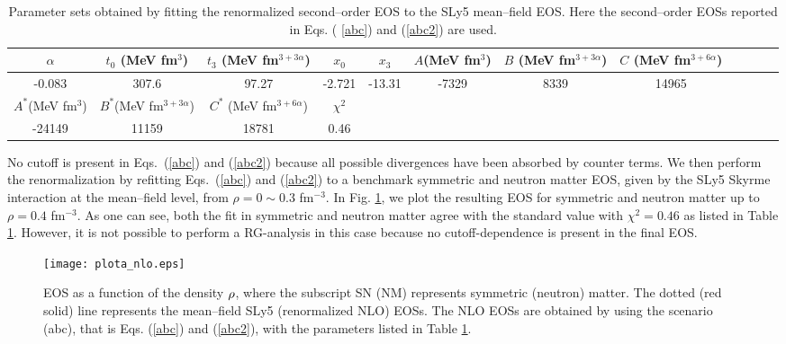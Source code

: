 \documentclass[aps,11pt,prc,preprint,superscriptaddress,nofootinbib]{revtex4}
\begin{document}
\begin{table}[tbp]
\centering%
\begin{tabular}{cccccccccccc}
\hline\hline
$\alpha $ & $t_{0}$ (MeV fm$^{3}$) & $t_{3}$ (MeV fm$^{3+3\alpha}$) & $x_{0}$
& $x_{3}$ & $A$(MeV fm$^{3}$) & $B$ (MeV fm$^{3+3\alpha}$) & $C$ (MeV fm$%
^{3+6\alpha}$) &  &  &  &  \\ \hline
-0.083 & 307.6 & 97.27 & -2.721 & -13.31 & -7329 & 8339 & 14965 &  &  &  &
\\ \hline\hline
$A^{\ast}$(MeV fm$^{3}$) & $B^{\ast }$(MeV fm$^{3+3\alpha}$) & $C^{\ast }$
(MeV fm$^{3+6\alpha}$) & $\chi ^{2}$ &  &  &  &  &  &  &  &  \\ \hline
-24149 & 11159 & 18781 & 0.46 &  &  &  &  &  &  &  &  \\ \hline\hline
\end{tabular}%
\caption{Parameter sets obtained by fitting the renormalized second--order
EOS to the SLy5 mean--field EOS. Here the second--order EOSs reported in Eqs. (%
\protect\ref{abc}) and (\protect\ref{abc2}) are used.}
\label{tnloa}
\end{table} 

No cutoff is present in Eqs.~(\ref{abc}) and (\ref{abc2}) because 
all possible divergences have been absorbed by counter
terms. We then perform the renormalization by refitting Eqs.~(\ref{abc}) and (\ref{abc2}) to a
 benchmark symmetric and neutron matter EOS, given by the SLy5 Skyrme interaction at the 
mean--field level, from $\rho=0\sim0.3$ fm$^{-3}$. In Fig. \ref{plotnloa}, we plot the resulting EOS for symmetric and
neutron matter up to $\rho=0.4$ fm$^{-3}$. As one can see, both the fit in
symmetric and neutron matter agree with the standard value with $\chi ^{2}=0.46$
as listed in Table \ref{tnloa}. However, it is not possible to perform
a RG-analysis in this case because no cutoff-dependence is present in the final
EOS.
\begin{figure}[htbp]
\texttt{[image: plota\_nlo.eps]}
\caption{EOS as a function of the density $\protect\rho $,
where the subscript SN (NM) represents symmetric (neutron) matter. The
dotted (red solid) line represents the mean--field SLy5 (renormalized
NLO) EOSs. The NLO EOSs are obtained
by using the scenario (abc), that is  Eqs. (\protect\ref{abc}) and (\protect\ref{abc2}), with the parameters listed
in Table \protect\ref{tnloa}. }
\label{plotnloa}
\end{figure}
\end{document}
